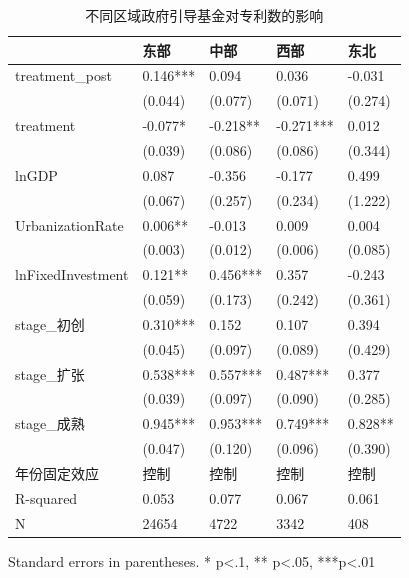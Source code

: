 \begin{table}
\caption{不同区域政府引导基金对专利数的影响}
\label{}
\begin{center}
\begin{tabular}{lllll}
\hline
                  & 东部       & 中部       & 西部        & 东北       \\
\hline
treatment\_post   & 0.146*** & 0.094    & 0.036     & -0.031   \\
                  & (0.044)  & (0.077)  & (0.071)   & (0.274)  \\
treatment         & -0.077*  & -0.218** & -0.271*** & 0.012    \\
                  & (0.039)  & (0.086)  & (0.086)   & (0.344)  \\
lnGDP             & 0.087    & -0.356   & -0.177    & 0.499    \\
                  & (0.067)  & (0.257)  & (0.234)   & (1.222)  \\
UrbanizationRate              & 0.006**  & -0.013   & 0.009     & 0.004    \\
                  & (0.003)  & (0.012)  & (0.006)   & (0.085)  \\
lnFixedInvestment & 0.121**  & 0.456*** & 0.357     & -0.243   \\
                  & (0.059)  & (0.173)  & (0.242)   & (0.361)  \\
stage\_初创         & 0.310*** & 0.152    & 0.107     & 0.394    \\
                  & (0.045)  & (0.097)  & (0.089)   & (0.429)  \\
stage\_扩张         & 0.538*** & 0.557*** & 0.487***  & 0.377    \\
                  & (0.039)  & (0.097)  & (0.090)   & (0.285)  \\
stage\_成熟         & 0.945*** & 0.953*** & 0.749***  & 0.828**  \\
                  & (0.047)  & (0.120)  & (0.096)   & (0.390)  \\
年份固定效应  & 控制 & 控制 & 控制 & 控制\\ 
\hline

R-squared         & 0.053    & 0.077    & 0.067     & 0.061    \\
N                 & 24654    & 4722     & 3342      & 408      \\
\hline
\end{tabular}
\end{center}
\end{table}
\bigskip
Standard errors in parentheses. \newline 
* p<.1, ** p<.05, ***p<.01

